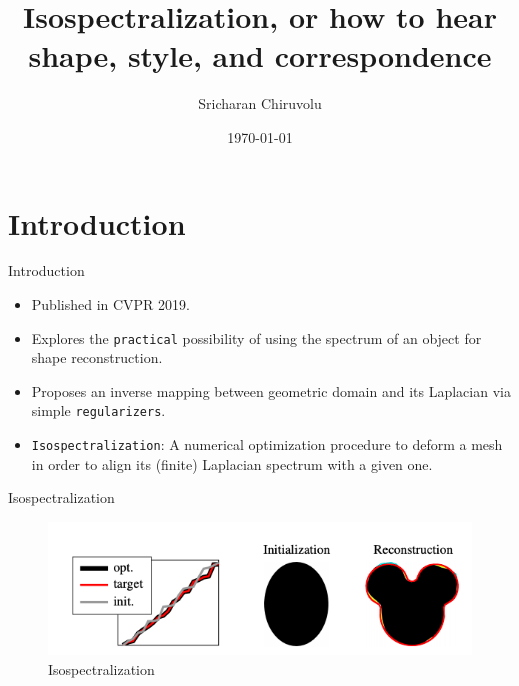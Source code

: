 \documentclass{beamer}
\title[Isospectralization]{Isospectralization, or how to hear shape, style, and correspondence}
\author{Sricharan Chiruvolu}
\institute{Advisor: Zorah Lähner}
\date{\today}
\begin{document}
\begin{frame}
  \titlepage
\end{frame}





\section{Introduction}

\begin{frame}{Introduction}

\begin{itemize}
  \item Published in CVPR 2019.
  \item Explores the \texttt{practical} possibility of using the spectrum of an object for shape reconstruction.
  \item Proposes an inverse mapping between geometric domain and its Laplacian via simple \texttt{regularizers}.
  \item \texttt{Isospectralization}: A numerical optimization procedure to deform a mesh in order to align its (finite) Laplacian spectrum with a given one.
\end{itemize}

\end{frame}

\begin{frame}{Isospectralization}

\begin{figure}
    \centering
    \includegraphics[height=0.2\textwidth]{Spectral.png}
    \caption{Isospectralization}
    \label{fig:Isospectralization}
\end{figure}


\end{frame}
\end{document}

